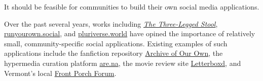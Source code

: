 







\begin{requirement}[Personalization]
\label{requirements:easy}
   It should be feasible for communities to build
   their own social media applications.
\end{requirement}

Over the past several years,
works including
\emph{\href{https://publicinfrastructure.org/2023/03/29/the-three-legged-stool/}{The Three-Legged Stool}},
\href{https://runyourown.social}{runyourown.social},
and \href{https://pluriverse.world/}{pluriverse.world}
have opined the importance of relatively small,
community-specific social applications.
Existing examples of such applications include the fanfiction
repository \href{https://archiveofourown.org/}{Archive of Our Own},
the hypermedia curation platform \href{https://www.are.na}{are.na},
the movie review site \href{https://letterboxd.com/}{Letterboxd},
and Vermont's local \href{https://frontporchforum.com/}{Front Porch Forum}.

